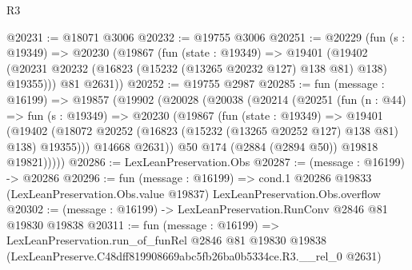 \begin{lexlean}{R3}
\begin{coremodule}
@20231 := @18071 @3006
@20232 := @19755 @3006
@20251 := @20229
    (fun (s : @19349) =>
    @20230
      (@19867
        (fun (state : @19349) =>
        @19401 (@19402 (@20231 @20232 (@16823 (@15232 (@13265 @20232 @127) @138 @81) @138) @19355)))
        @81
        @2631))
@20252 := @19755 @2987
@20285 := fun (message : @16199) =>
  @19857
    (@19902
      (@20028
        (@20038
          (@20214
            (@20251
              (fun (n : @44) =>
              fun (s : @19349) =>
              @20230
                (@19867
                  (fun (state : @19349) =>
                  @19401
                    (@19402
                      (@18072 @20252 (@16823 (@15232 (@13265 @20252 @127) @138 @81) @138) @19355)))
                  @14668
                  @2631))
              @50
              @174
              (@2884 (@2894 @50))
              @19818
              @19821)))))
@20286 := LexLeanPreservation.Obs
@20287 := (message : @16199) -> @20286
@20296 := fun (message : @16199) =>
  cond.{1} @20286 @19833 (LexLeanPreservation.Obs.value @19837) LexLeanPreservation.Obs.overflow
@20302 := (message : @16199) -> LexLeanPreservation.RunConv @2846 @81 @19830 @19838
@20311 := fun (message : @16199) =>
  LexLeanPreservation.run_of_funRel
    @2846
    @81
    @19830
    @19838
    (LexLeanPreserve.C48dff819908669abc5fb26ba0b5334ce.R3.__rel_0 @2631)
\end{coremodule}
\end{lexlean}
